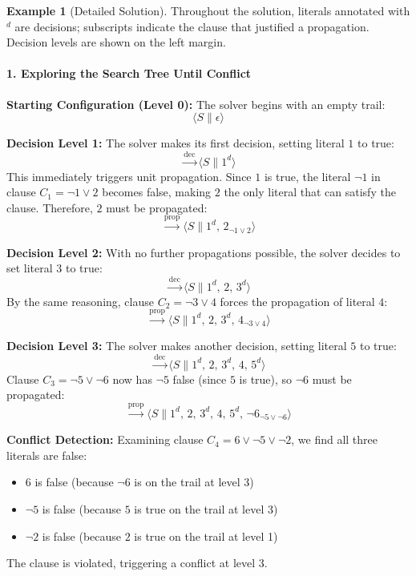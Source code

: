 \documentclass[11pt,a4paper]{article}
\theoremstyle{definition}
\newtheorem{example}{Example}[section]
\theoremstyle{plain}
\theoremstyle{remark}
\begin{document}
\begin{example}[Detailed Solution]
Throughout the solution, literals annotated with $^d$ are decisions; subscripts indicate the clause that justified a propagation. Decision levels are shown on the left margin.

\paragraph{1. Exploring the Search Tree Until Conflict}

\textbf{Starting Configuration (Level 0):}
The solver begins with an empty trail:
\[
\langle S \parallel \epsilon \rangle
\]

\textbf{Decision Level 1:}
The solver makes its first decision, setting literal $1$ to true:
\[
\xrightarrow{\text{dec}} \langle S \parallel 1^{d} \rangle
\]
This immediately triggers unit propagation. Since $1$ is true, the literal $\neg 1$ in clause $C_1 = \neg 1 \lor 2$ becomes false, making $2$ the only literal that can satisfy the clause. Therefore, $2$ must be propagated:
\[
\xrightarrow{\text{prop}} \langle S \parallel 1^{d},\, 2_{\neg 1 \lor 2} \rangle
\]

\textbf{Decision Level 2:}
With no further propagations possible, the solver decides to set literal $3$ to true:
\[
\xrightarrow{\text{dec}} \langle S \parallel 1^{d},\, 2,\, 3^{d} \rangle
\]
By the same reasoning, clause $C_2 = \neg 3 \lor 4$ forces the propagation of literal $4$:
\[
\xrightarrow{\text{prop}} \langle S \parallel 1^{d},\, 2,\, 3^{d},\, 4_{\neg 3 \lor 4} \rangle
\]

\textbf{Decision Level 3:}
The solver makes another decision, setting literal $5$ to true:
\[
\xrightarrow{\text{dec}} \langle S \parallel 1^{d},\, 2,\, 3^{d},\, 4,\, 5^{d} \rangle
\]
Clause $C_3 = \neg 5 \lor \neg 6$ now has $\neg 5$ false (since $5$ is true), so $\neg 6$ must be propagated:
\[
\xrightarrow{\text{prop}} \langle S \parallel 1^{d},\, 2,\, 3^{d},\, 4,\, 5^{d},\, \neg 6_{\neg 5 \lor \neg 6} \rangle
\]

\textbf{Conflict Detection:}
Examining clause $C_4 = 6 \lor \neg 5 \lor \neg 2$, we find all three literals are false:
\begin{itemize}
    \item $6$ is false (because $\neg 6$ is on the trail at level 3)
    \item $\neg 5$ is false (because $5$ is true on the trail at level 3)
    \item $\neg 2$ is false (because $2$ is true on the trail at level 1)
\end{itemize}
The clause is violated, triggering a conflict at level 3.


\end{example}
\end{document}
